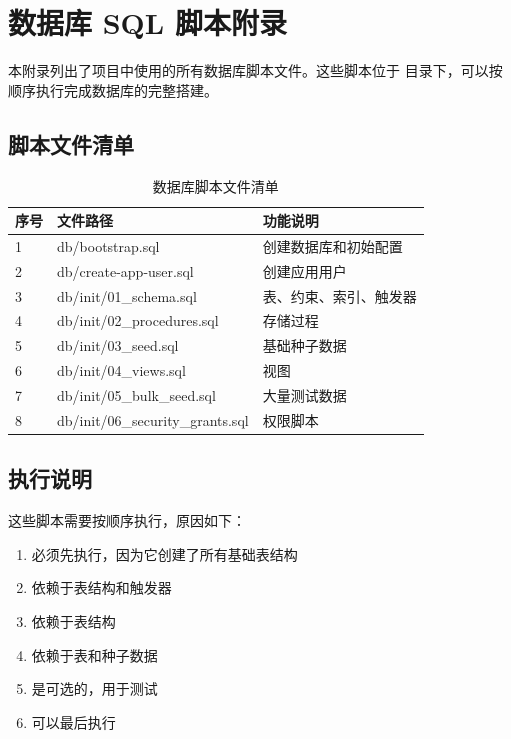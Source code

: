 \chapter{数据库 SQL 脚本附录}

本附录列出了项目中使用的所有数据库脚本文件。这些脚本位于  目录下，可以按顺序执行完成数据库的完整搭建。

\section{脚本文件清单}

\begin{table}[H]
  \centering
  \caption{数据库脚本文件清单}
  \label{tab:sql_scripts}
  \begin{tabularx}{\textwidth}{|l|l|X|}
    \hline
    \textbf{序号} & \textbf{文件路径} & \textbf{功能说明} \\
    \hline
    1 & db/bootstrap.sql & 创建数据库和初始配置 \\
    \hline
    2 & db/create-app-user.sql & 创建应用用户 \\
    \hline
    3 & db/init/01\_schema.sql & 表、约束、索引、触发器 \\
    \hline
    4 & db/init/02\_procedures.sql & 存储过程 \\
    \hline
    5 & db/init/03\_seed.sql & 基础种子数据 \\
    \hline
    6 & db/init/04\_views.sql & 视图 \\
    \hline
    7 & db/init/05\_bulk\_seed.sql & 大量测试数据 \\
    \hline
    8 & db/init/06\_security\_grants.sql & 权限脚本 \\
    \hline
  \end{tabularx}
\end{table}

\section{执行说明}

这些脚本需要按顺序执行，原因如下：

\begin{enumerate}
  \item {} 必须先执行，因为它创建了所有基础表结构
  \item {} 依赖于表结构和触发器
  \item {} 依赖于表结构
  \item {} 依赖于表和种子数据
  \item {} 是可选的，用于测试
  \item {} 可以最后执行
\end{enumerate}

